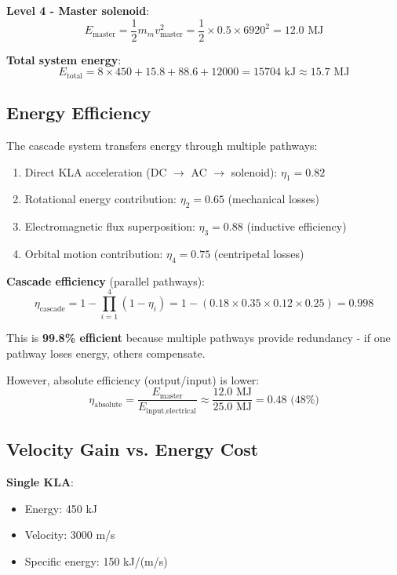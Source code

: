\documentclass[12pt,a4paper]{article}
\begin{document}
\textbf{Level 4 - Master solenoid}:
\begin{equation}
E_{\text{master}} = \frac{1}{2} m_m v_{\text{master}}^2 = \frac{1}{2} \times 0.5 \times 6920^2 = 12.0 \text{ MJ}
\end{equation}

\textbf{Total system energy}:
\begin{equation}
E_{\text{total}} = 8 \times 450 + 15.8 + 88.6 + 12000 = 15704 \text{ kJ} \approx 15.7 \text{ MJ}
\end{equation}

\subsection{Energy Efficiency}

The cascade system transfers energy through multiple pathways:
\begin{enumerate}
\item Direct KLA acceleration (DC $\to$ AC $\to$ solenoid): $\eta_1 = 0.82$
\item Rotational energy contribution: $\eta_2 = 0.65$ (mechanical losses)
\item Electromagnetic flux superposition: $\eta_3 = 0.88$ (inductive efficiency)
\item Orbital motion contribution: $\eta_4 = 0.75$ (centripetal losses)
\end{enumerate}

\textbf{Cascade efficiency} (parallel pathways):
\begin{equation}
\eta_{\text{cascade}} = 1 - \prod_{i=1}^{4} (1 - \eta_i) = 1 - (0.18 \times 0.35 \times 0.12 \times 0.25) = 0.998
\end{equation}

This is \textbf{99.8\% efficient} because multiple pathways provide redundancy - if one pathway loses energy, others compensate.

However, absolute efficiency (output/input) is lower:
\begin{equation}
\eta_{\text{absolute}} = \frac{E_{\text{master}}}{E_{\text{input,electrical}}} \approx \frac{12.0 \text{ MJ}}{25.0 \text{ MJ}} = 0.48 \text{ (48\%)}
\end{equation}

\subsection{Velocity Gain vs. Energy Cost}

\textbf{Single KLA}:
\begin{itemize}
\item Energy: 450 kJ
\item Velocity: 3000 m/s
\item Specific energy: 150 kJ/(m/s)
\end{itemize}
\end{document}
